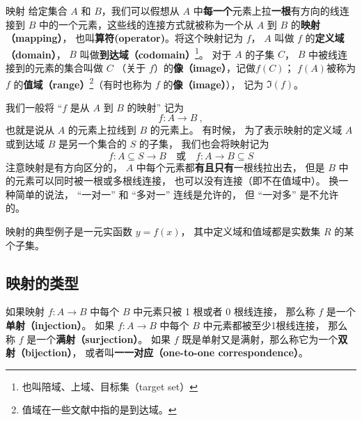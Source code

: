 

\begin{definition}{映射}
给定集合 $A$ 和 $B$，我们可以假想从 $A$ 中\textbf{每一个}元素上拉\textbf{一根}有方向的线连接到 $B$ 中的一个元素，这些线的连接方式就被称为一个从 $A$ 到 $B$ 的\textbf{映射（mapping）}， 也叫\textbf{算符(operator)}。将这个映射记为 $f$， $A$ 叫做 $f$ 的\textbf{定义域（domain）}， $B$ 叫做\textbf{到达域（codomain）}\footnote{也叫陪域、上域、目标集（target set）}。 对于 $A$ 的子集 $C$， $B$ 中被线连接到的元素的集合叫做 $C$ （关于 $f$）的\textbf{像（image）}，记做$f(C)$； $f(A)$被称为 $f$ 的\textbf{值域（range）}\footnote{值域在一些文献中指的是到达域。}（有时也称为 $f$ 的\textbf{像（image）}）， 记为 $\Im(f)$。
\end{definition}

我们一般将 “$f$ 是从 $A$ 到 $B$ 的映射” 记为
\begin{equation}
f: A \to B~,
\end{equation}
也就是说从 $A$ 的元素上拉线到 $B$ 的元素上。 有时候， 为了表示映射的定义域 $A$ 或到达域 $B$ 是另一个集合的 $S$ 的子集， 我们也会将映射记为
\begin{equation}
f: A\subseteq S \to B \quad\text{或}\quad f: A \to B \subseteq S
\end{equation}
注意映射是有方向区分的， $A$ 中每个元素都\textbf{有且只有}一根线拉出去， 但是 $B$ 中的元素可以同时被一根或多根线连接， 也可以没有连接（即不在值域中）。 换一种简单的说法， “一对一” 和 “多对一” 连线是允许的， 但 “一对多” 是不允许的。

\begin{example}{}
映射的典型例子是一元实函数 $y = f(x)$， 其中定义域和值域都是实数集 $R$ 的某个子集。
\end{example}

\subsection{映射的类型}
\begin{definition}{}\label{def_map_1}
如果映射 $f: A  \to B$ 中每个 $B$ 中元素只被 1 根或者 0 根线连接， 那么称 $f$ 是一个\textbf{单射（injection）}。 如果 $f: A \to B$ 中每个 $B$ 中元素都被至少1根线连接， 那么称 $f$ 是一个\textbf{满射（surjection）}。 如果 $f$ 既是单射又是满射，那么称它为一个\textbf{双射（bijection）}， 或者叫\textbf{一一对应（one-to-one correspondence）}。
\end{definition}

